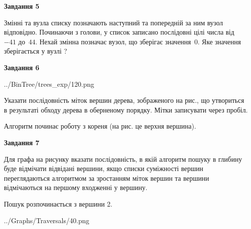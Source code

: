\documentclass[12pt, ukrainian]{article}
\begin{document}
{\begin {large}
{\begin {center}\textbf{Завдання 5}\end {center}}\par
Змінні  та  вузла списку позначають наступний та попередній за ним вузол відповідно. Починаючи з голови, у список записано послідовні цілі числа від~$-41$ до~$44$. Нехай змінна  позначає вузол, що зберігає значення~$0$.
Яке значення зберігається у вузлі  ?\par
\newpage

{\begin {center}\textbf{Завдання 6}\end {center}}\par

\begin{center}
	{../BinTree/trees_exp/120.png}
\end{center}
Указати послідовність міток вершин дерева, зображеного на рис., що утвориться в результаті обходу дерева в оберненому порядку. Мітки записувати через пробіл.\par Алгоритм починає роботу з кореня (на рис. це верхня вершина).\par
\newpage

{\begin {center}\textbf{Завдання 7}\end {center}}\par
Для графа на рисунку вказати послідовність, в якій алгоритм пошуку в глибину буде відмічати відвідані вершини, якщо списки суміжності вершин переглядаються алгоритмом за зростанням міток вершин та вершини відмічаються на першому вход\-женні у вершину.\par
Пошук розпочинається з вершини 2.\par

\begin{center}
	{../Graphs/Traversals/40.png}
\end{center}\par
\newpage


\end{large}}
\end{document}
